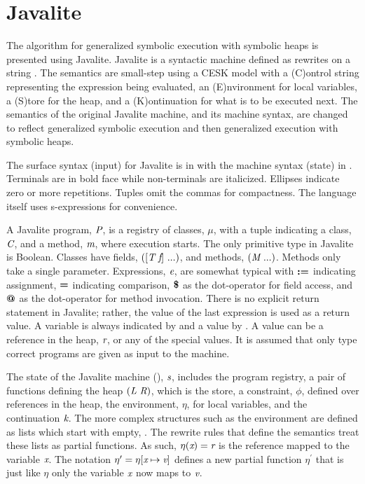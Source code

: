 \section{Javalite}
The algorithm for generalized symbolic execution with symbolic heaps
is presented using Javalite. Javalite is a syntactic machine defined
as rewrites on a string \cite{saints-MS}. The semantics are small-step
using a CESK model with a (C)ontrol string representing the expression
being evaluated, an (E)nvironment for local variables, a (S)tore for
the heap, and a (K)ontinuation for what is to be executed next. The
semantics of the original Javalite machine, and its machine syntax,
are changed to reflect generalized symbolic execution and then
generalized execution with symbolic heaps.

The surface syntax (input) for Javalite is in
 with the machine syntax (state) in
. Terminals are in bold face while
non-terminals are italicized. Ellipses indicate zero or more
repetitions. Tuples omit the commas for compactness. The language
itself uses s-expressions for convenience.




A Javalite program, $\emph{P}$, is a registry of classes, $\mu$, with
a tuple indicating a class, $\emph{C}$, and a method, $\emph{m}$,
where execution starts. The only primitive type in Javalite is
Boolean. Classes have fields, $([\emph{T}\ \emph{f}]\ ...)$, and
methods, $(\emph{M}\ ...)$. Methods only take a single
parameter. Expressions, $\emph{e}$, are somewhat typical with
$\textbf{:=}$ indicating assignment, $\textbf{=}$ indicating comparison,
$\textbf{\$}$ as the dot-operator for field access, and $\textbf{@}$ as
the dot-operator for method invocation. There is no explicit return
statement in Javalite; rather, the value of the last expression is
used as a return value. A variable is always indicated by 
and a value by . A value can be a reference in the heap,
$\emph{r}$, or any of the special values. It is assumed that only
type correct programs are given as input to the machine.

The state of the Javalite machine (),
$\emph{s}$, includes the program registry, a pair of functions
defining the heap $(\emph{L}\ \emph{R})$, which is the store, a
constraint, $\phi$, defined over references in the heap, the
environment, $\eta$, for local variables, and the continuation
$\emph{k}$. The more complex structures such as the environment are
defined as lists which start with empty, . The rewrite rules
that define the semantics treat these lists as partial
functions. As such, $\eta(\emph{x}) = \emph{r}$ is the
reference mapped to the variable $\emph{x}$. The notation
$\eta^\prime = \eta[\emph{x} \mapsto \emph{v}]$ defines a new
partial function $\eta^\prime$ that is just like $\eta$ only the
variable $\emph{x}$ now maps to $\emph{v}$. 


